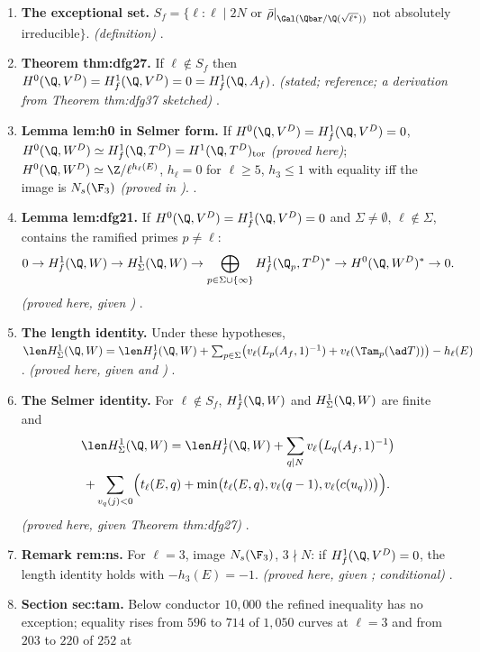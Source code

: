 \begin{enumerate}[label=\textbf{\thechapter.\arabic*}]
\item \textbf{The exceptional set.} $S_f=\{\ell:\ell\mid2N$ or $\bar\rho|_{\Gal(\Qbar/\Q(\sqrt{\ell^*}))}$ not absolutely irreducible$\}$. \emph{(definition)} .
\item \textbf{Theorem thm:dfg27.} If $\ell\notin S_f$ then $H^0(\Q,V^D)=H^1_f(\Q,V^D)=0=H^1_f(\Q,A_f)$. \emph{(stated; reference; a derivation from Theorem thm:dfg37 sketched)}
.
\item \textbf{Lemma lem:h0 in Selmer form.} If $H^0(\Q,V^D)=H^1_f(\Q,V^D)=0$, $H^0(\Q,W^D)\simeq H^1_f(\Q,T^D)=H^1(\Q,T^D)_{\mathrm{tor}}$ \emph{(proved here)}; $H^0(\Q,W^D)\simeq\Z/\ell^{h_\ell(E)}$, $h_\ell=0$ for
$\ell\ge5$, $h_3\le1$ with equality iff the image is $N_s(\F_3)$ \emph{(proved in )}. .
\item \textbf{Lemma lem:dfg21.} If $H^0(\Q,V^D)=H^1_f(\Q,V^D)=0$ and $\Sigma\ne\emptyset$, $\ell\notin\Sigma$, contains the ramified primes $p\ne\ell$:
\[
0\to H^1_f(\Q,W)\to H^1_\Sigma(\Q,W)\to\bigoplus_{p\in\Sigma\cup\{\infty\}}H^1_f(\Q_p,T^D)^*\to H^0(\Q,W^D)^*\to0.
\]
\emph{(proved here, given )} .
\item \textbf{The length identity.} Under these hypotheses,
$\len H^1_\Sigma(\Q,W)=\len H^1_f(\Q,W)+\sum_{p\in\Sigma}\bigl(v_\ell(L_p(A_f,1)^{-1})+v_\ell(\Tam_p(\ad T))\bigr)-h_\ell(E)$. \emph{(proved here, given 
and )} .
\item \textbf{The Selmer identity.} For $\ell\notin S_f$, $H^1_f(\Q,W)$ and $H^1_\Sigma(\Q,W)$ are finite and
\begin{multline*}
\len H^1_\Sigma(\Q,W)=\len H^1_f(\Q,W)+\sum_{q\mid N}v_\ell\bigl(L_q(A_f,1)^{-1}\bigr)\\
+\sum_{v_q(j)<0}\Bigl(t_\ell(E,q)+\min\bigl(t_\ell(E,q),v_\ell(q-1),v_\ell(c(u_q))\bigr)\Bigr).
\end{multline*}
\emph{(proved here, given Theorem thm:dfg27)} .
\item \textbf{Remark rem:ns.} For $\ell=3$, image $N_s(\F_3)$, $3\nmid N$: if $H^1_f(\Q,V^D)=0$, the length identity holds with $-h_3(E)=-1$. \emph{(proved here, given ; conditional)}
.
\item \textbf{Section sec:tam.} Below conductor $10{,}000$ the refined inequality has no exception; equality rises from $596$ to $714$ of $1{,}050$ curves at $\ell=3$ and from $203$ to $220$ of $252$ at

\end{enumerate}
